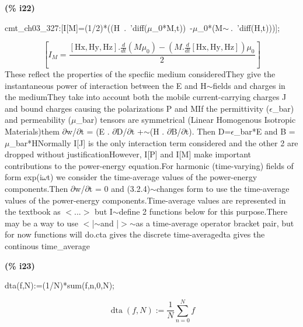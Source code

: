 \documentclass[fleqn]{article}
\begin{document}
\noindent
\begin{minipage}[t]{4.000000em}\color{red}\bfseries
(\% i22)	
\end{minipage}
\begin{minipage}[t]{\textwidth}\color{blue}
cmt\_ch03\_327:[I[M]=(1/2)*((H\ .\ 'diff(\ensuremath{\mu}\_0*M,t))\ -\ensuremath{\mu}\_0*(M\ensuremath{\sim\ }.\ 'diff(H,t)))];
\end{minipage}
\[\displaystyle \tag{cmt\_ ch03\_ 327} 
\left[ {I_M}=\frac{\left[ \ensuremath{\mathrm{Hx}}\operatorname{,}\ensuremath{\mathrm{Hy}}\operatorname{,}\ensuremath{\mathrm{Hz}}\right] \ensuremath{\mathrm{ . }}\frac{d}{d t} \left( M {{\mu }_0}\right) -\left( M\ensuremath{\mathrm{ . }}\frac{d}{d t} \left[ \ensuremath{\mathrm{Hx}}\operatorname{,}\ensuremath{\mathrm{Hy}}\operatorname{,}\ensuremath{\mathrm{Hz}}\right] \right)  {{\mu }_0}}{2}\right] \mbox{}
\]
These reflect the properties of the specfiic medium consideredThey give the instantaneous power of interaction between the E and H\ensuremath{\sim }fields and charges in the mediumThey take into account both the mobile current-carrying charges  J and bound charges causing the polarizations P and MIf the permittivity (\ensuremath{\epsilon}\_bar) and permeability (\ensuremath{\mu}\_bar) tensors are symmetrical (Linear Homogenous Isotropic Materials)them \ensuremath{\partial}w/\ensuremath{\partial}t = (E . \ensuremath{\partial}D/\ensuremath{\partial}t +\ensuremath{\sim }(H . \ensuremath{\partial}B/\ensuremath{\partial}t). Then D=\ensuremath{\epsilon}\_bar*E and B = \ensuremath{\mu}\_bar*HNormally I[J] is the only interaction term considered and the other 2 are dropped without justificationHowever, I[P] and I[M] make important contributions to the power-energy equation.For harmonic (time-varying) fields of form exp(i\ensuremath{\omega}t) we consider the time-average values of the power-energy components.Then \ensuremath{\partial}w/\ensuremath{\partial}t = 0 and (3.2.4)\ensuremath{\sim }changes form to use the time-average values of the power-energy components.Time-average values are represented in the textbook as \ensuremath{<}...\ensuremath{>} but I\ensuremath{\sim }define 2 functions below for this purpose.There may be a way to use \ensuremath{<}|\ensuremath{\sim }and |\ensuremath{>}\ensuremath{\sim }as a time-average operator bracket pair, but for now functions will do.cta gives the discrete time-averagedta gives the continous time\_average


\noindent
\begin{minipage}[t]{4.000000em}\color{red}\bfseries
(\% i23)	
\end{minipage}
\begin{minipage}[t]{\textwidth}\color{blue}
dta(f,N):=(1/N)*sum(f,n,0,N);
\end{minipage}
\[\displaystyle \tag{\% o23} 
\operatorname{dta}\left( f\operatorname{,}N\right) \operatorname{:=}\frac{1}{N} \sum_{n=0}^{N}{\left. f\right.}\mbox{}
\]
\end{document}
